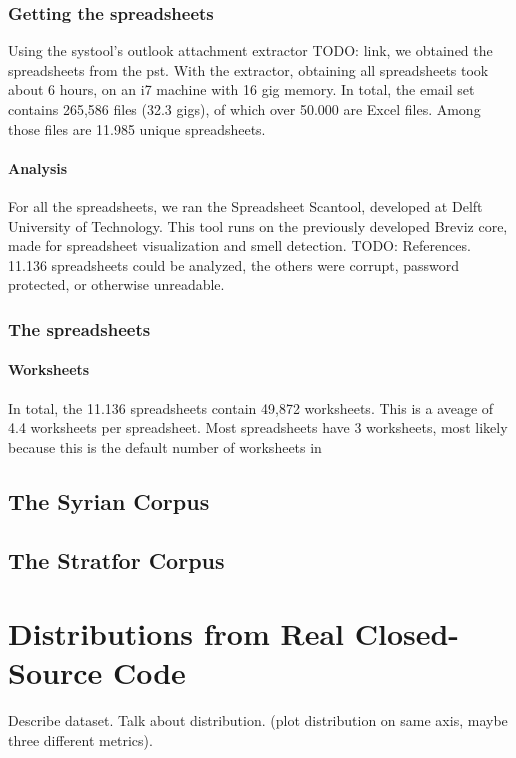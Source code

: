 \documentclass[conference]{IEEEtran}
\begin{document}
\subsubsection{Getting the spreadsheets}
Using the systool's outlook attachment extractor TODO: link, we obtained the spreadsheets from the pst. With the extractor, obtaining all spreadsheets took about 6 hours, on an i7 machine with 16 gig memory. In total, the email set contains 265,586 files (32.3 gigs), of which over 50.000 are Excel files. Among those files are 11.985 unique spreadsheets.

\paragraph{Analysis}
For all the spreadsheets, we ran the Spreadsheet Scantool, developed at Delft University of Technology. This tool runs on the previously developed Breviz core, made for spreadsheet visualization and smell detection. TODO: References. 11.136 spreadsheets could be analyzed, the others were corrupt, password protected, or otherwise unreadable.

\subsubsection{The spreadsheets}
\paragraph{Worksheets}
In total, the 11.136 spreadsheets contain 49,872 worksheets. This is a aveage of 4.4 worksheets per spreadsheet. Most spreadsheets have 3 worksheets, most likely because this is the default number of worksheets in 

\subsection{The Syrian Corpus}

\subsection{The Stratfor Corpus}

\section{Distributions from Real Closed-Source Code}

Describe dataset.
Talk about distribution. (plot distribution on same axis, maybe three different metrics).
\end{document}
